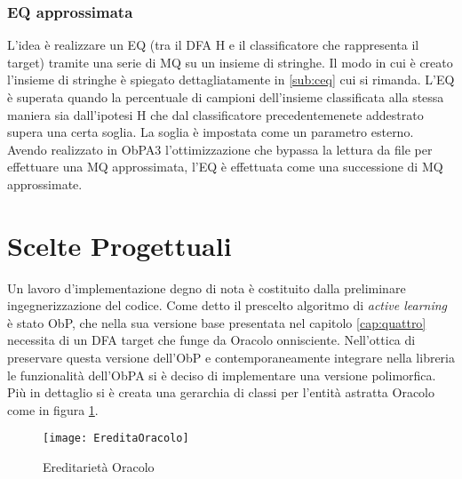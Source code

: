 \subsubsection{EQ approssimata}
L'idea è realizzare un \ac{EQ} (tra il \ac{DFA} \ac{H} e il classificatore che rappresenta il target) tramite una serie di \ac{MQ} su un insieme di stringhe. Il modo in cui è creato l'insieme di stringhe è spiegato dettagliatamente in \ref{sub:ceq} cui si rimanda. L'\ac{EQ} è superata quando la percentuale di campioni dell'insieme  classificata alla stessa maniera sia dall'ipotesi \ac{H} che dal classificatore precedentemenete addestrato supera una certa soglia. La soglia è impostata come un parametro esterno. 
Avendo realizzato in \ac{ObPA}3 l'ottimizzazione che bypassa la lettura da file per effettuare una \ac{MQ} approssimata, l'\ac{EQ} è effettuata come una successione di \ac{MQ} approssimate.



 


\section{Scelte Progettuali}
Un lavoro d'implementazione degno di nota è costituito dalla preliminare ingegnerizzazione del codice. Come detto il prescelto algoritmo di \textit{active learning} è stato \ac{ObP}, che nella sua versione base presentata nel capitolo \ref{cap:quattro} necessita di un \ac{DFA} target che funge da Oracolo onnisciente. Nell'ottica di preservare questa versione dell'\ac{ObP} e contemporaneamente integrare nella libreria le funzionalità dell'\ac{ObPA} si è deciso di implementare una versione polimorfica. Più in dettaglio si è creata una gerarchia di classi per l'entità astratta Oracolo come in figura \ref{fig:eor}.
\begin{figure}[htp]
	\centering
	\texttt{[image: EreditaOracolo]}
	\caption[Ereditarietà Oracolo]{Ereditarietà Oracolo}
   \label{fig:eor}
\end{figure}

